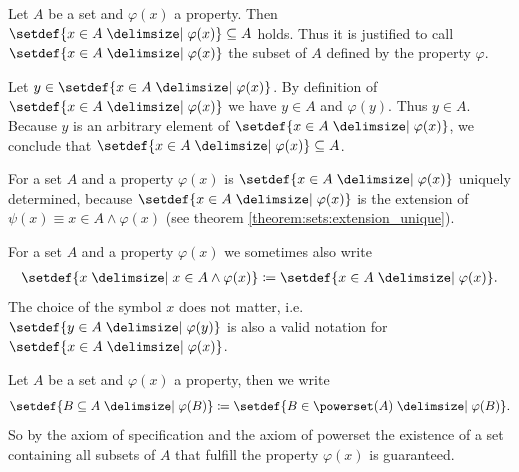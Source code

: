 \begin{remarks}
    \begin{remarkenumerate}
        \item\label{remark:sets:specification_subset} Let $A$ be a set and $\varphi(x)$ a property. Then $\setdef{x\in A\given\varphi(x)}\subseteq A$ holds. Thus it is justified to call $\setdef{x\in A\given\varphi(x)}$ the subset of $A$ defined by the property $\varphi$.
        \begin{miniproof}
            Let $y\in\setdef{x\in A\given\varphi(x)}$. By definition of $\setdef{x\in A\given\varphi(x)}$ we have $y\in A$ and $\varphi(y)$. Thus $y\in A$. Because $y$ is an arbitrary element of $\setdef{x\in A\given\varphi(x)}$, we conclude that $\setdef{x\in A\given\varphi(x)}\subseteq A$.
        \end{miniproof}
        \item For a set $A$ and a property $\varphi(x)$ is $\setdef{x\in A\given \varphi(x)}$ uniquely determined, because $\setdef{x\in A\given\varphi(x)}$ is the extension of $\psi(x)\equiv x\in A\land \varphi(x)$ (see theorem \ref{theorem:sets:extension_unique}).
        \item For a set $A$ and a property $\varphi(x)$ we sometimes also write \begin{align}\setdef{x\given x\in A\land \varphi(x)}\coloneq \setdef{x\in A\given\varphi(x)}.\end{align}
        The choice of the symbol $x$ does not matter, i.e. $\setdef{y\in A\given \varphi(y)}$ is also a valid notation for $\setdef{x\in A\given\varphi(x)}$.
        \item\label{remark:sets:specification_subsets} Let $A$ be a set and $\varphi(x)$ a property, then we write
        \begin{align}\setdef{B\subseteq A\given \varphi(B)}\coloneq \setdef{B\in\powerset(A)\given \varphi(B)}.\end{align}
        So by the axiom of specification and the axiom of powerset the existence of a set containing all subsets of $A$ that fulfill the property $\varphi(x)$ is guaranteed.
    \end{remarkenumerate}
\end{remarks}

